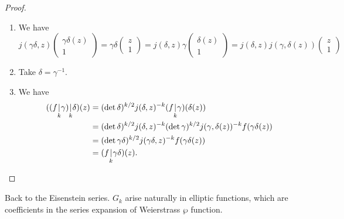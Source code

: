 \documentclass[a4paper]{article}
\begin{document}
\begin{proof}\leavevmode
  \begin{enumerate}
    \item We have
      \[
        j(\gamma\delta, z)
        \begin{pmatrix}
          \gamma\delta(z)\\
          1
        \end{pmatrix} =
        \gamma\delta
        \begin{pmatrix}
          z\\1
        \end{pmatrix}
        =
        j(\delta, z) \gamma
        \begin{pmatrix}
          \delta(z)\\
          1
        \end{pmatrix}
        =
        j(\delta, z) j(\gamma, \delta(z))
        \begin{pmatrix}
          z\\1
        \end{pmatrix}
      \]
    \item Take $\delta = \gamma^{-1}$.
    \item We have
      \begin{align*}
        ((f\underset{k}{|} \gamma) \underset{k}{|} \delta)(z) &= (\det \delta)^{k/2} j(\delta, z)^{-k} (f\underset{k}{|} \gamma) (\delta(z))\\
        &= (\det \delta)^{k/2} j(\delta, z)^{-k} (\det \gamma)^{k/2} j(\gamma, \delta(z))^{-k} f(\gamma\delta(z))\\
        &= (\det \gamma \delta)^{k/2} j(\gamma \delta, z)^{-k} f(\gamma\delta(z))\\
        &= (f\underset{k}{|} \gamma\delta) (z).\qedhere
      \end{align*}%
  \end{enumerate}
\end{proof}
Back to the Eisenstein series. $G_k$ arise naturally in elliptic functions, which are coefficients in the series expansion of Weierstrass $\wp$ function.
\end{document}
